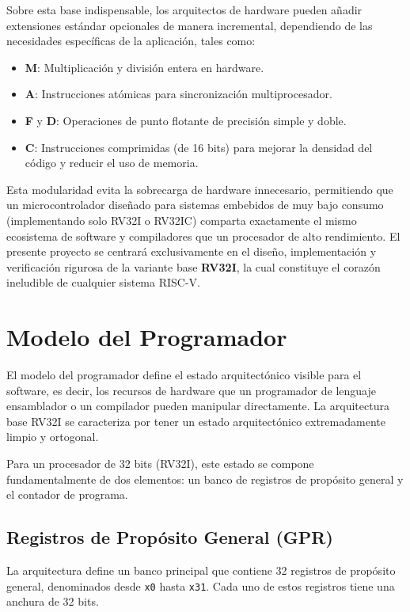 Sobre esta base indispensable, los arquitectos de hardware pueden añadir extensiones estándar opcionales de manera incremental, dependiendo de las necesidades específicas de la aplicación, tales como:
\begin{itemize}
    \item \textbf{M}: Multiplicación y división entera en hardware.
    \item \textbf{A}: Instrucciones atómicas para sincronización multiprocesador.
    \item \textbf{F} y \textbf{D}: Operaciones de punto flotante de precisión simple y doble.
    \item \textbf{C}: Instrucciones comprimidas (de 16 bits) para mejorar la densidad del código y reducir el uso de memoria.
\end{itemize}



Esta modularidad evita la sobrecarga de hardware innecesario, permitiendo que un microcontrolador diseñado para sistemas embebidos de muy bajo consumo (implementando solo RV32I o RV32IC) comparta exactamente el mismo ecosistema de software y compiladores que un procesador de alto rendimiento. El presente proyecto se centrará exclusivamente en el diseño, implementación y verificación rigurosa de la variante base \textbf{RV32I}, la cual constituye el corazón ineludible de cualquier sistema RISC-V.




\section{Modelo del Programador}
\label{sec:ModeloProgramador}

El modelo del programador define el estado arquitectónico visible para el software, es decir, los recursos de hardware que un programador de lenguaje ensamblador o un compilador pueden manipular directamente. La arquitectura base RV32I se caracteriza por tener un estado arquitectónico extremadamente limpio y ortogonal. 

Para un procesador de 32 bits (RV32I), este estado se compone fundamentalmente de dos elementos: un banco de registros de propósito general y el contador de programa.



\subsection{Registros de Propósito General (GPR)}
La arquitectura define un banco principal que contiene 32 registros de propósito general, denominados desde \texttt{x0} hasta \texttt{x31}. Cada uno de estos registros tiene una anchura de 32 bits. 

